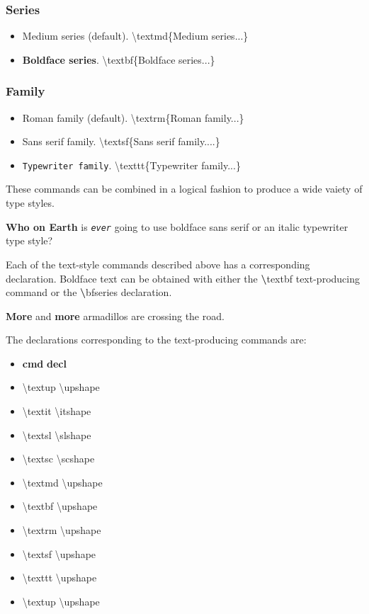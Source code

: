 \documentclass[twocolumn]{book}        %
\begin{document}
\subsubsection*{Series}
\begin{itemize}
    \item \textmd{Medium series (default)}. \textbackslash textmd\{Medium series...\}
    \item \textbf{Boldface series}. \textbackslash textbf\{Boldface series...\}
\end{itemize}
\subsubsection*{Family}
\begin{itemize}
    \item \textrm{Roman family (default)}. \textbackslash textrm\{Roman family...\}
    \item \textsf{Sans serif family}. \textbackslash textsf\{Sans serif family....\}
    \item \texttt{Typewriter family}. \textbackslash texttt\{Typewriter family...\}
\end{itemize}

These commands can be combined in a logical fashion to produce a wide vaiety of type styles.

\textsf{\textbf{Who \textmd{on} Earth}} is \textit{\texttt{ever}} 
going to use boldface sans serif or an italic typewriter type style?

Each of the text-style commands described above has a corresponding declaration.
Boldface text can be obtained with either the {\textbf \textbackslash textbf} text-producing
command or the {\textbf \textbackslash bfseries} declaration.

\textbf{More} and {\bfseries more} armadillos are crossing the road.

The declarations corresponding to the text-producing commands are:

\begin{itemize}
    \item \textbf{cmd} \textbf{decl}
    \item \textbackslash textup \textbackslash upshape
    \item \textbackslash textit \textbackslash itshape
    \item \textbackslash textsl \textbackslash slshape
    \item \textbackslash textsc \textbackslash scshape
    \item \textbackslash textmd \textbackslash upshape
    \item \textbackslash textbf \textbackslash upshape
    \item \textbackslash textrm \textbackslash upshape
    \item \textbackslash textsf \textbackslash upshape
    \item \textbackslash texttt \textbackslash upshape
    \item \textbackslash textup \textbackslash upshape
\end{itemize}
\end{document}
